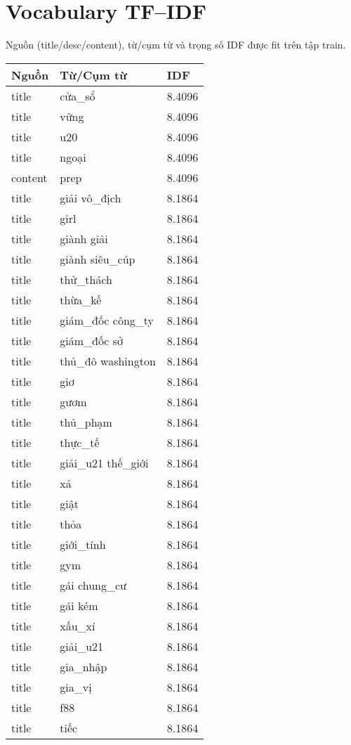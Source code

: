 \documentclass{article}
\begin{document}
\section*{Vocabulary TF--IDF}
\noindent Nguồn (title/desc/content), từ/cụm từ và trọng số IDF được fit trên tập train.\\
\begin{tabular}{lll}
\toprule
Nguồn & Từ/Cụm từ & IDF\\
\midrule
title & cửa\_sổ & 8.4096\\
title & vững & 8.4096\\
title & u20 & 8.4096\\
title & ngoại & 8.4096\\
content & prep & 8.4096\\
title & giải vô\_địch & 8.1864\\
title & girl & 8.1864\\
title & giành giải & 8.1864\\
title & giành siêu\_cúp & 8.1864\\
title & thử\_thách & 8.1864\\
title & thừa\_kế & 8.1864\\
title & giám\_đốc công\_ty & 8.1864\\
title & giám\_đốc sở & 8.1864\\
title & thủ\_đô washington & 8.1864\\
title & giơ & 8.1864\\
title & gươm & 8.1864\\
title & thủ\_phạm & 8.1864\\
title & thực\_tế & 8.1864\\
title & giải\_u21 thế\_giới & 8.1864\\
title & xả & 8.1864\\
title & giật & 8.1864\\
title & thỏa & 8.1864\\
title & giới\_tính & 8.1864\\
title & gym & 8.1864\\
title & gái chung\_cư & 8.1864\\
title & gái kém & 8.1864\\
title & xấu\_xí & 8.1864\\
title & giải\_u21 & 8.1864\\
title & gia\_nhập & 8.1864\\
title & gia\_vị & 8.1864\\
title & f88 & 8.1864\\
title & tiếc & 8.1864\\

\end{tabular}
\end{document}
